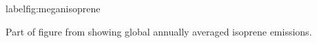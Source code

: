 label{fig:meganisoprene}

Part of figure from \citet{Guenther_2006} showing global annually averaged isoprene emissions.
